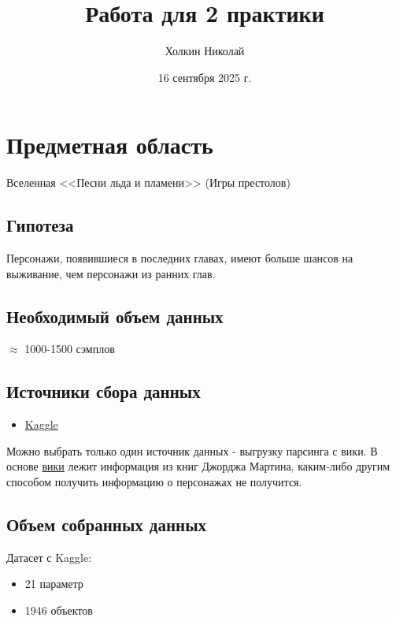 


	\title{Работа для 2 практики}
	\author{Холкин Николай}
	\date{16 сентября 2025 г.}
	
	\maketitle
	
		
		
	\section{Предметная область}
		Вселенная <<Песни льда и пламени>> (Игры престолов)
		
	\subsection{Гипотеза}
		Персонажи, появившиеся в последних главах, имеют больше шансов
		на выживание, чем персонажи из ранних глав.
	\subsection{Необходимый объем данных}
		$\approx$ 1000-1500 сэмплов
		
	\subsection{Источники сбора данных}
		\begin{itemize}
			\item \href{https://www.kaggle.com/competitions/got-predicting-characters-deaths/}{Kaggle}
		\end{itemize}
		
	Можно выбрать только один источник данных - выгрузку парсинга с вики. В основе \href{http://awoiaf.westeros.org}{вики} лежит информация из книг Джорджа Мартина, каким-либо другим способом получить информацию о персонажах не получится. 
	
	\subsection {Объем собранных данных}
		Датасет с Kaggle:
		\begin{itemize}
			\item 21 параметр
			\item 1946 объектов
		\end{itemize}
		

